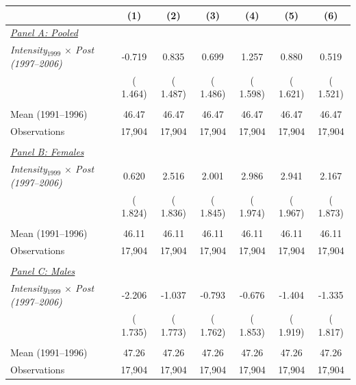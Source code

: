 \begin{tabular}{lcccccc} \hline \hline
& \multicolumn{1}{c}{(1)} & \multicolumn{1}{c}{(2)} & \multicolumn{1}{c}{(3)} & \multicolumn{1}{c}{(4)} & \multicolumn{1}{c}{(5)} & \multicolumn{1}{c}{(6)} \\ \toprule
\underline{\textit{Panel A: Pooled}}  \\ 
\textit{Intensity$_{1999}$ $\times$ Post (1997--2006)} &       -0.719 &        0.835 &        0.699 &        1.257 &        0.880 &        0.519 \\ 
 & (       1.464) & (       1.487) & (       1.486) & (       1.598) & (       1.621) & (       1.521) \\ 
  & & & & & & \\ 
Mean (1991--1996) &        46.47 &        46.47 &        46.47 &        46.47 &        46.47 &        46.47 \\ 
Observations &       17,904 &       17,904 &       17,904 &       17,904 &       17,904 &       17,904 \\ 
  & & & & & & \\ 
\underline{\textit{Panel B: Females}}  \\ 
\textit{Intensity$_{1999}$ $\times$ Post (1997--2006)} &        0.620 &        2.516 &        2.001 &        2.986 &        2.941 &        2.167 \\ 
 & (       1.824) & (       1.836) & (       1.845) & (       1.974) & (       1.967) & (       1.873) \\ 
  & & & & & & \\ 
Mean (1991--1996) &        46.11 &        46.11 &        46.11 &        46.11 &        46.11 &        46.11 \\ 
Observations &       17,904 &       17,904 &       17,904 &       17,904 &       17,904 &       17,904 \\ 
  & & & & & & \\ 
\underline{\textit{Panel C: Males}}  \\ 
\textit{Intensity$_{1999}$ $\times$ Post (1997--2006)} &       -2.206 &       -1.037 &       -0.793 &       -0.676 &       -1.404 &       -1.335 \\ 
 & (       1.735) & (       1.773) & (       1.762) & (       1.853) & (       1.919) & (       1.817) \\ 
  & & & & & & \\ 
Mean (1991--1996) &        47.26 &        47.26 &        47.26 &        47.26 &        47.26 &        47.26 \\ 
Observations &       17,904 &       17,904 &       17,904 &       17,904 &       17,904 &       17,904 \\ 

\end{tabular}
